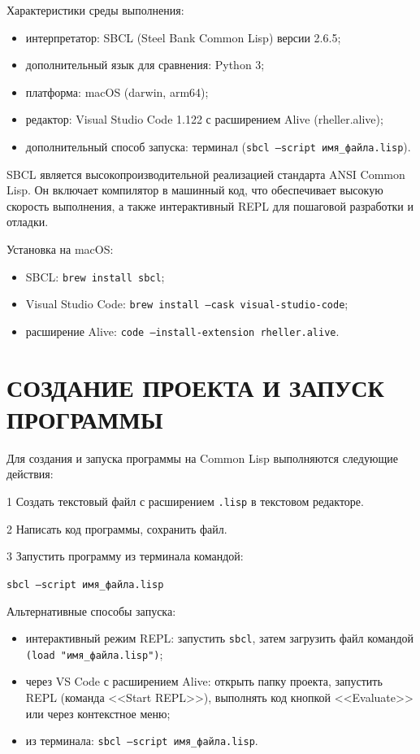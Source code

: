 \documentclass[14pt,a4paper]{extarticle}
\begin{document}
Характеристики среды выполнения:
\begin{itemize}[nosep]
  \item интерпретатор: SBCL (Steel Bank Common Lisp) версии 2.6.5;
  \item дополнительный язык для сравнения: Python 3;
  \item платформа: macOS (darwin, arm64);
  \item редактор: Visual Studio Code 1.122 с расширением Alive (rheller.alive);
  \item дополнительный способ запуска: терминал (\texttt{sbcl --script имя\_файла.lisp}).
\end{itemize}

SBCL является высокопроизводительной реализацией стандарта ANSI Common Lisp. Он включает компилятор в машинный код, что обеспечивает высокую скорость выполнения, а также интерактивный REPL для пошаговой разработки и отладки.

Установка на macOS:
\begin{itemize}[nosep]
  \item SBCL: \texttt{brew install sbcl};
  \item Visual Studio Code: \texttt{brew install --cask visual-studio-code};
  \item расширение Alive: \texttt{code --install-extension rheller.alive}.
\end{itemize}

\newpage

\section{СОЗДАНИЕ ПРОЕКТА И ЗАПУСК ПРОГРАММЫ}

Для создания и запуска программы на Common Lisp выполняются следующие действия:

1 Создать текстовый файл с расширением \texttt{.lisp} в текстовом редакторе.

2 Написать код программы, сохранить файл.

3 Запустить программу из терминала командой:

\texttt{sbcl --script имя\_файла.lisp}

Альтернативные способы запуска:

\begin{itemize}[nosep]
  \item интерактивный режим REPL: запустить \texttt{sbcl}, затем загрузить файл командой \texttt{(load "имя\_файла.lisp")};
  \item через VS Code с расширением Alive: открыть папку проекта, запустить REPL (команда <<Start REPL>>), выполнять код кнопкой <<Evaluate>> или через контекстное меню;
  \item из терминала: \texttt{sbcl --script имя\_файла.lisp}.
\end{itemize}
\end{document}
